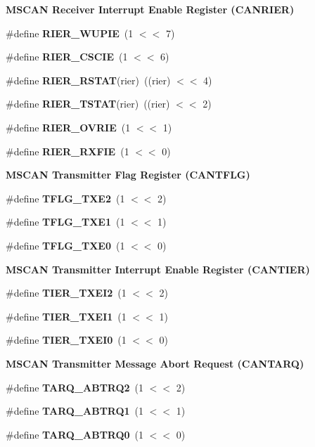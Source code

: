 \begin{Indent}\textbf{ M\+S\+C\+AN Receiver Interrupt Enable Register (C\+A\+N\+R\+I\+ER)}\par
\begin{DoxyCompactItemize}
\item 
\#define {\bfseries R\+I\+E\+R\+\_\+\+W\+U\+P\+IE}~(1 $<$$<$ 7)
\item 
\#define {\bfseries R\+I\+E\+R\+\_\+\+C\+S\+C\+IE}~(1 $<$$<$ 6)
\item 
\#define {\bfseries R\+I\+E\+R\+\_\+\+R\+S\+T\+AT}(rier)~((rier) $<$$<$ 4)
\item 
\#define {\bfseries R\+I\+E\+R\+\_\+\+T\+S\+T\+AT}(rier)~((rier) $<$$<$ 2)
\item 
\#define {\bfseries R\+I\+E\+R\+\_\+\+O\+V\+R\+IE}~(1 $<$$<$ 1)
\item 
\#define {\bfseries R\+I\+E\+R\+\_\+\+R\+X\+F\+IE}~(1 $<$$<$ 0)
\end{DoxyCompactItemize}
\end{Indent}
\begin{Indent}\textbf{ M\+S\+C\+AN Transmitter Flag Register (C\+A\+N\+T\+F\+LG)}\par
\begin{DoxyCompactItemize}
\item 
\#define {\bfseries T\+F\+L\+G\+\_\+\+T\+X\+E2}~(1 $<$$<$ 2)
\item 
\#define {\bfseries T\+F\+L\+G\+\_\+\+T\+X\+E1}~(1 $<$$<$ 1)
\item 
\#define {\bfseries T\+F\+L\+G\+\_\+\+T\+X\+E0}~(1 $<$$<$ 0)
\end{DoxyCompactItemize}
\end{Indent}
\begin{Indent}\textbf{ M\+S\+C\+AN Transmitter Interrupt Enable Register (C\+A\+N\+T\+I\+ER)}\par
\begin{DoxyCompactItemize}
\item 
\#define {\bfseries T\+I\+E\+R\+\_\+\+T\+X\+E\+I2}~(1 $<$$<$ 2)
\item 
\#define {\bfseries T\+I\+E\+R\+\_\+\+T\+X\+E\+I1}~(1 $<$$<$ 1)
\item 
\#define {\bfseries T\+I\+E\+R\+\_\+\+T\+X\+E\+I0}~(1 $<$$<$ 0)
\end{DoxyCompactItemize}
\end{Indent}
\begin{Indent}\textbf{ M\+S\+C\+AN Transmitter Message Abort Request (C\+A\+N\+T\+A\+RQ)}\par
\begin{DoxyCompactItemize}
\item 
\#define {\bfseries T\+A\+R\+Q\+\_\+\+A\+B\+T\+R\+Q2}~(1 $<$$<$ 2)
\item 
\#define {\bfseries T\+A\+R\+Q\+\_\+\+A\+B\+T\+R\+Q1}~(1 $<$$<$ 1)
\item 
\#define {\bfseries T\+A\+R\+Q\+\_\+\+A\+B\+T\+R\+Q0}~(1 $<$$<$ 0)
\end{DoxyCompactItemize}
\end{Indent}
